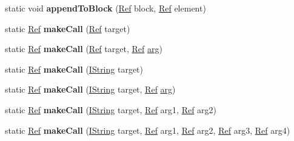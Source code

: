 \begin{DoxyCompactItemize}
\item 
\mbox{\label{classcashew_1_1_value_builder_a85f067754cecccd4945c85d9ab6eda67}} 
static void {\bfseries append\+To\+Block} (\mbox{\hyperlink{structcashew_1_1_ref}{Ref}} block, \mbox{\hyperlink{structcashew_1_1_ref}{Ref}} element)
\item 
\mbox{\label{classcashew_1_1_value_builder_ab9325ea5a40b247e977144f807b9423c}} 
static \mbox{\hyperlink{structcashew_1_1_ref}{Ref}} {\bfseries make\+Call} (\mbox{\hyperlink{structcashew_1_1_ref}{Ref}} target)
\item 
\mbox{\label{classcashew_1_1_value_builder_a392b99cad03e271f4c840286f132e6e4}} 
static \mbox{\hyperlink{structcashew_1_1_ref}{Ref}} {\bfseries make\+Call} (\mbox{\hyperlink{structcashew_1_1_ref}{Ref}} target, \mbox{\hyperlink{structcashew_1_1_ref}{Ref}} \mbox{\hyperlink{unionarg}{arg}})
\item 
\mbox{\label{classcashew_1_1_value_builder_ad35dd6b234bc84f7a784b206d0fcff20}} 
static \mbox{\hyperlink{structcashew_1_1_ref}{Ref}} {\bfseries make\+Call} (\mbox{\hyperlink{structcashew_1_1_i_string}{I\+String}} target)
\item 
\mbox{\label{classcashew_1_1_value_builder_afeb5bc2aca960382e84c6a146ffd3970}} 
static \mbox{\hyperlink{structcashew_1_1_ref}{Ref}} {\bfseries make\+Call} (\mbox{\hyperlink{structcashew_1_1_i_string}{I\+String}} target, \mbox{\hyperlink{structcashew_1_1_ref}{Ref}} \mbox{\hyperlink{unionarg}{arg}})
\item 
\mbox{\label{classcashew_1_1_value_builder_a233efba779fc46652d757364721ecd60}} 
static \mbox{\hyperlink{structcashew_1_1_ref}{Ref}} {\bfseries make\+Call} (\mbox{\hyperlink{structcashew_1_1_i_string}{I\+String}} target, \mbox{\hyperlink{structcashew_1_1_ref}{Ref}} arg1, \mbox{\hyperlink{structcashew_1_1_ref}{Ref}} arg2)
\item 
\mbox{\label{classcashew_1_1_value_builder_aa600cde1930f9e16de027f613c47b84b}} 
static \mbox{\hyperlink{structcashew_1_1_ref}{Ref}} {\bfseries make\+Call} (\mbox{\hyperlink{structcashew_1_1_i_string}{I\+String}} target, \mbox{\hyperlink{structcashew_1_1_ref}{Ref}} arg1, \mbox{\hyperlink{structcashew_1_1_ref}{Ref}} arg2, \mbox{\hyperlink{structcashew_1_1_ref}{Ref}} arg3, \mbox{\hyperlink{structcashew_1_1_ref}{Ref}} arg4)

\end{DoxyCompactItemize}
